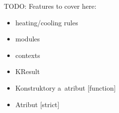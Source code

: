 \documentclass{fithesis3}
\begin{document}







%
%

TODO: Features to cover here:
\begin{itemize}
\item heating/cooling rules
\item modules
\item contexts
\item KResult
\item Konstruktory a~atribut [function]
\item Atribut [strict]
\end{itemize}


%
%
%
%
\end{document}
